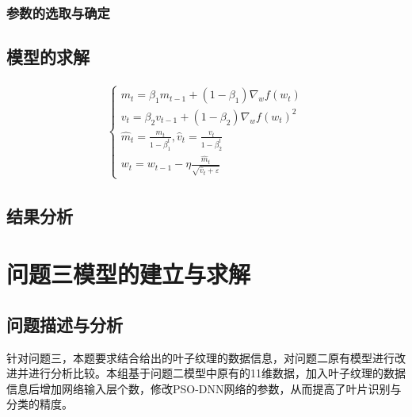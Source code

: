 \documentclass{whutmod}
\begin{document}
	\subsubsection{参数的选取与确定}
	
	
	\subsection{模型的求解}
	
	\begin{gather*}\label{adam}
	\left\{\begin{array}{l}{m_{t}=\beta_{1} m_{t-1}+\left(1-\beta_{1}\right) \nabla_{w} f\left(w_{t}\right)} \\ {v_{t}=\beta_{2} v_{t-1}+\left(1-\beta_{2}\right) \nabla_{w} f\left(w_{t}\right)^{2}} \\ {\widehat{m}_{t}=\frac{m_{t}}{1-\beta_{1}^{t}}, \hat{v}_{t}=\frac{v_{t}}{1-\beta_{2}^{t}}} \\ {w_{t}=w_{t-1}-\eta \frac{\widehat{m}_{t}}{\sqrt{\hat{v}_{t}+\varepsilon}}}\end{array}\right.
	\end{gather*}

	
	\subsection{结果分析}
     
			
	


	\section{问题三模型的建立与求解}
    \subsection{问题描述与分析}
    针对问题三，本题要求结合给出的叶子纹理的数据信息，对问题二原有模型进行改进并进行分析比较。本组基于问题二模型中原有的11维数据，加入叶子纹理的数据信息后增加网络输入层个数，修改PSO-DNN网络的参数，从而提高了叶片识别与分类的精度。
		
\end{document}
